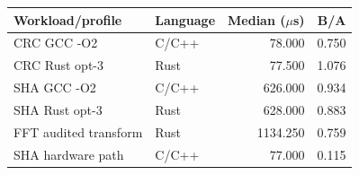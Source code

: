 \begin{tabular}{@{}llrr@{}}
\toprule
Workload/profile & Language & Median (\(\mu\)s) & B/A \\
\midrule
CRC GCC -O2 & C/C++ & 78.000 & 0.750 \\
CRC Rust opt-3 & Rust & 77.500 & 1.076 \\
SHA GCC -O2 & C/C++ & 626.000 & 0.934 \\
SHA Rust opt-3 & Rust & 628.000 & 0.883 \\
FFT audited transform & Rust & 1134.250 & 0.759 \\
SHA hardware path & C/C++ & 77.000 & 0.115 \\
\bottomrule
\end{tabular}
